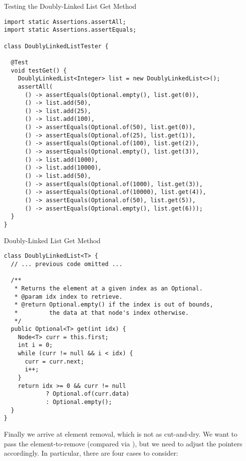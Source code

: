 \begin{cl}[]{Testing the Doubly-Linked List Get Method}
\begin{lstlisting}[language=MyJava]
import static Assertions.assertAll;
import static Assertions.assertEquals;

class DoublyLinkedListTester {

  @Test
  void testGet() {
    DoublyLinkedList<Integer> list = new DoublyLinkedList<>();
    assertAll(
      () -> assertEquals(Optional.empty(), list.get(0)),
      () -> list.add(50),
      () -> list.add(25),
      () -> list.add(100),
      () -> assertEquals(Optional.of(50), list.get(0)),
      () -> assertEquals(Optional.of(25), list.get(1)),
      () -> assertEquals(Optional.of(100), list.get(2)),
      () -> assertEquals(Optional.empty(), list.get(3)),
      () -> list.add(1000),
      () -> list.add(10000),
      () -> list.add(50),
      () -> assertEquals(Optional.of(1000), list.get(3)),
      () -> assertEquals(Optional.of(10000), list.get(4)),
      () -> assertEquals(Optional.of(50), list.get(5)),
      () -> assertEquals(Optional.empty(), list.get(6)));
  }
}
\end{lstlisting}
\end{cl}

\begin{cl}[]{Doubly-Linked List Get Method}
\begin{lstlisting}[language=MyJava]
class DoublyLinkedList<T> {
  // ... previous code omitted ...

  /**
   * Returns the element at a given index as an Optional.
   * @param idx index to retrieve.
   * @return Optional.empty() if the index is out of bounds,
   *         the data at that node's index otherwise.
   */
  public Optional<T> get(int idx) {
    Node<T> curr = this.first;
    int i = 0;
    while (curr != null && i < idx) {
      curr = curr.next;
      i++;
    }
    return idx >= 0 && curr != null
            ? Optional.of(curr.data)
            : Optional.empty();
  }
}
\end{lstlisting}
\end{cl}

Finally we arrive at element removal, which is not as cut-and-dry. We want to pass the element-to-remove (compared via ), but we need to adjust the pointers accordingly. In particular, there are four cases to consider:

